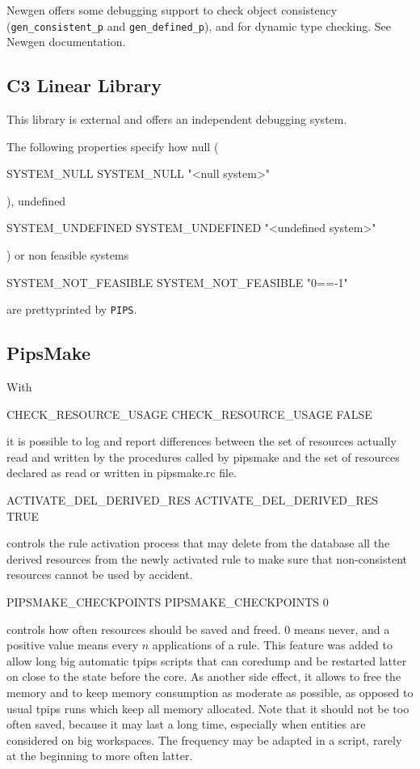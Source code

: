 \documentclass[a4paper]{report}
\begin{document}
Newgen offers some debugging support to check object consistency
(\verb+gen_consistent_p+ and \verb+gen_defined_p+), and for dynamic type
checking. See Newgen documentation\cite{JT89}\cite{JT90}.

\subsection{C3 Linear Library}

This library is external and offers an independent debugging system.

The following properties specify how null (
\begin{PipsProp}{SYSTEM_NULL}
SYSTEM_NULL "<null system>"
\end{PipsProp}
),
undefined
\begin{PipsProp}{SYSTEM_UNDEFINED}
SYSTEM_UNDEFINED "<undefined system>"
\end{PipsProp}
) or non feasible
systems
\begin{PipsProp}{SYSTEM_NOT_FEASIBLE}
SYSTEM_NOT_FEASIBLE "{0==-1}"
\end{PipsProp}
are prettyprinted by {\tt PIPS}.

\subsection{PipsMake}

With
\begin{PipsProp}{CHECK_RESOURCE_USAGE}
CHECK_RESOURCE_USAGE FALSE
\end{PipsProp}
it is possible to log and report differences between the set of resources
actually read and written by the procedures called by pipsmake and the set
of resources declared as read or written in pipsmake.rc file.

\begin{PipsProp}{ACTIVATE_DEL_DERIVED_RES}
ACTIVATE_DEL_DERIVED_RES TRUE
\end{PipsProp}
controls the rule activation process that may delete from the database all the
derived resources from the newly activated rule to make sure that
non-consistent resources cannot be used by accident.

\begin{PipsProp}{PIPSMAKE_CHECKPOINTS}
PIPSMAKE_CHECKPOINTS 0
\end{PipsProp}
controls how often resources should be saved and freed. $0$ means never, and
a positive value means every $n$ applications of a rule. This feature
was added to allow long big automatic tpips scripts that can coredump and
be restarted latter on close to the state before the core. As another side
effect, it allows to free the memory and to keep memory consumption as
moderate as possible, as opposed to usual tpips runs which keep all
memory allocated. Note that it should not be too often saved, because it
may last a long time, especially when entities are considered on big
workspaces. The frequency may be adapted in a script, rarely at the
beginning to more often latter.
\end{document}
